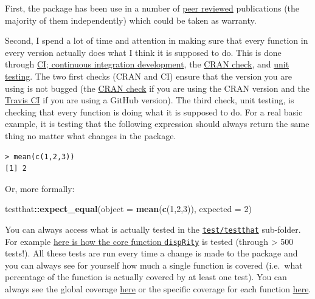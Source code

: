 \documentclass[
]{book}
\newenvironment{Shaded}{\begin{snugshade}}{\end{snugshade}}
\newcommand{\DataTypeTok}[1]{\textcolor[rgb]{0.13,0.29,0.53}{#1}}
\newcommand{\DecValTok}[1]{\textcolor[rgb]{0.00,0.00,0.81}{#1}}
\newcommand{\KeywordTok}[1]{\textcolor[rgb]{0.13,0.29,0.53}{\textbf{#1}}}
\newcommand{\NormalTok}[1]{#1}
\newcommand{\OperatorTok}[1]{\textcolor[rgb]{0.81,0.36,0.00}{\textbf{#1}}}
\begin{document}
First, the package has been use in a number of \href{https://scholar.google.co.uk/scholar?oi=bibs\&hl=en\&cites=13311379491028410826,7753828186872068057}{peer reviewed} publications (the majority of them independently) which could be taken as warranty.

Second, I spend a lot of time and attention in making sure that every function in every version actually does what I think it is supposed to do.
This is done through \href{https://en.wikipedia.org/wiki/Continuous_integration}{CI; continuous integration development}, the \href{https://cran.r-project.org/web/checks/check_results_dispRity.html}{CRAN check}, and \href{https://en.wikipedia.org/wiki/Unit_testing}{unit testing}.
The two first checks (CRAN and CI) ensure that the version you are using is not bugged (the \href{https://cran.r-project.org/web/checks/check_results_dispRity.html}{CRAN check} if you are using the CRAN version and the \href{https://travis-ci.org/TGuillerme/dispRity}{Travis CI} if you are using a GitHub version).
The third check, unit testing, is checking that every function is doing what it is supposed to do. For a real basic example, it is testing that the following expression should always return the same thing no matter what changes in the package.

\begin{verbatim}
> mean(c(1,2,3))
[1] 2
\end{verbatim}

Or, more formally:

\begin{Shaded}
\begin{Highlighting}[]
\NormalTok{testthat}\OperatorTok{::}\KeywordTok{expect\_equal}\NormalTok{(}\DataTypeTok{object =} \KeywordTok{mean}\NormalTok{(}\KeywordTok{c}\NormalTok{(}\DecValTok{1}\NormalTok{,}\DecValTok{2}\NormalTok{,}\DecValTok{3}\NormalTok{)),}
                       \DataTypeTok{expected =} \DecValTok{2}\NormalTok{)}
\end{Highlighting}
\end{Shaded}

You can always access what is actually tested in the \href{https://github.com/TGuillerme/dispRity/tree/master/tests/testthat}{\texttt{test/testthat}} sub-folder.
For example \href{https://github.com/TGuillerme/dispRity/blob/master/tests/testthat/test-dispRity.R}{here is how the core function \texttt{dispRity}} is tested (through \textgreater{} 500 tests!).
All these tests are run every time a change is made to the package and you can always see for yourself how much a single function is covered (i.e.~what percentage of the function is actually covered by at least one test).
You can always see the global coverage \href{https://app.codecov.io/gh/TGuillerme/dispRity}{here} or the specific coverage for each function \href{https://codecov.io/gh/TGuillerme/dispRity/tree/master/R}{here}.
\end{document}
